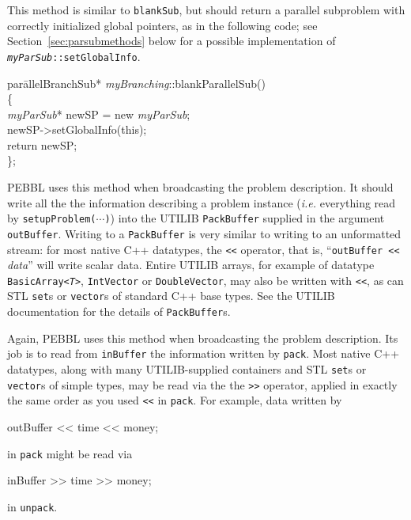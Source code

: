  This method is similar to
\texttt{blankSub}, but should return a parallel subproblem with
correctly initialized global pointers, as in the following code; see
Section~\ref{sec:parsubmethods} below for a possible implementation of
\texttt{\emph{myParSub}::setGlobalInfo}.
\begin{codeblock}
par\=allelBranchSub* \emph{myBranching}::blankParallelSub() \\
\{ \\
\>   \emph{myParSub}* newSP = new \emph{myParSub}; \\
\>    newSP->setGlobalInfo(this);\\
\>    return newSP; \\
\};
\end{codeblock}

 PEBBL uses this
method when broadcasting the problem description.  It should write all
the the information describing a problem instance (\emph{i.e.}
everything read by \texttt{setupProblem($\cdots$)}) into the UTILIB
\texttt{PackBuffer} supplied in the argument \texttt{outBuffer}.
Writing to a \texttt{PackBuffer} is very similar to writing to an
unformatted stream: for most native C++ datatypes, the \texttt{<<}
operator, that is, ``\texttt{outBuffer <<} \emph{data}'' will write
scalar data.  Entire UTILIB arrays, for example of datatype
\texttt{BasicArray<\textit{T}>}, 
\texttt{IntVector} or \texttt{DoubleVector}, may also be written with
\texttt{<<}, as can STL \texttt{set}s or 
\texttt{vector}s of standard C++ base types.
See the UTILIB documentation for the details of \texttt{PackBuffer}s.

Again, PEBBL
uses this method when broadcasting the problem description.  Its job
is to read from
\texttt{inBuffer} the information written by \texttt{pack}.  Most native C++
datatypes, along with many UTILIB-supplied containers and STL
\texttt{set}s or
\texttt{vector}s of simple types, may be read via
the the \texttt{>>} operator, applied in exactly the same order as you
used \texttt{<<} in \texttt{pack}.  For example, data written by
\begin{codeblock}
outBuffer << time << money;
\end{codeblock}
in \texttt{pack} might be read via
\begin{codeblock}
inBuffer >> time >> money;
\end{codeblock}
in \texttt{unpack}.  

